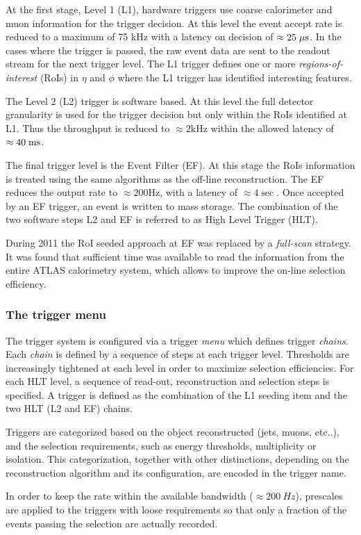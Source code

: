 At the first stage, Level 1 (L1), hardware triggers use coarse
calorimeter and muon information for the trigger decision. At this
level the event accept rate is reduced to a maximum of 75 kHz with a
latency on decision of $\approx{}25\; \mu\mathrm{s}{}$. In the cases where the
trigger is passed, the raw event data are sent to the readout stream
for the next trigger level. The L1 trigger defines one or more
\emph{regions-of-interest} (RoIs) in $\eta{}$ and $\phi{}$ where the
L1 trigger has identified interesting features. 

The Level 2 (L2) trigger is software based. At this level the full detector
granularity is used for the trigger decision but only within the RoIs
identified at L1. Thus the throughput is reduced to
$\approx{}2\mathrm{kHz}$ within the allowed latency of $\approx{}40\; \mathrm{ms}{}$.

The final trigger level is the Event Filter (EF). At this stage the RoIs
information is treated using the same algorithms as the off-line
reconstruction. The EF reduces the output rate to $\approx{}200\mathrm{Hz}$, 
with a latency of $\approx{}4\sec{}$. Once accepted by an EF trigger, an
event is written to mass storage.
The combination of the two software steps L2 and EF is referred to 
as High Level Trigger (HLT).

During 2011 the RoI seeded approach at EF was replaced by a
{\it full-scan} strategy. It was found that sufficient time was available
to read the information from the entire ATLAS calorimetry system, 
which allows to improve the on-line selection efficiency.

\subsubsection{The trigger menu}

The trigger system is configured via a trigger \textit{menu} which defines trigger \textit{chains}.
Each \textit{chain} is defined by a sequence of steps at each trigger level.
Thresholds are increasingly tightened at each level in order to maximize selection efficiencies.
For each HLT level, a sequence of read-out, reconstruction and selection steps is specified.
A trigger is defined as the combination of the L1 seeding item and the two HLT (L2 and EF) chains.

Triggers are categorized based on the object reconstructed (jets, muons, etc..), 
and the selection requirements, such as energy thresholds, multiplicity or isolation.
This categorization, together with other distinctions, depending on the reconstruction algorithm
and its configuration, are encoded in the trigger name.

In order to keep the rate within the available bandwidth ($\approx{}200~Hz$), 
prescales are applied to the triggers with loose requirements so that
only a fraction of the events passing the selection are actually recorded.
